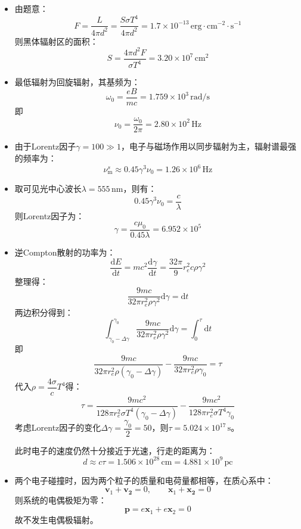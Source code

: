 \documentclass[a4paper,fontset=none]{ctexart}
\begin{document}
    \begin{itemize}
        \item[1.]
        由题意：
        \[
        F = \frac{L}{4\pi d^2} = \frac{S\sigma T^4}{4\pi d^2} = 1.7\times10^{-13}\,\mathrm{erg\cdot cm^{-2}\cdot s^{-1}}
        \]
        则黑体辐射区的面积：
        \[
        S = \frac{4\pi d^2 F}{\sigma T^4} = 3.20\times10^{7}\,\mathrm{cm^2}
        \]

        \item[2.(1)]
        最低辐射为回旋辐射，其基频为：
        \[
        \omega_0 = \frac{eB}{mc} = 1.759\times10^3\,\mathrm{rad/s}
        \]
        即
        \[
        \nu_0 = \frac{\omega_0}{2\pi} = 2.80\times10^2\,\mathrm{Hz}
        \]

        \item[2.(2)]
        由于Lorentz因子$\gamma = 100 \gg 1$，电子与磁场作用以同步辐射为主，辐射谱最强的频率为：
        \[
        \nu_\mathrm{m}^s \approx 0.45\gamma^3\nu_0 = 1.26\times10^6\,\mathrm{Hz}
        \]

        \item[2.(3)]
        取可见光中心波长$\lambda = 555\,\mathrm{nm}$，则有：
        \[
        0.45\gamma^3\nu_0 = \frac{c}{\lambda}
        \]
        则Lorentz因子为：
        \[
        \gamma = \frac{c\mu_0}{0.45\lambda} = 6.952\times10^{5}
        \]

        \item[4.]
        逆Compton散射的功率为：
        \[
        \frac{\mathrm{d}E}{\mathrm{d}t}
        = mc^2\frac{\mathrm{d}\gamma}{\mathrm{d}t}
        = \frac{32\pi}{9}r_e^2 c\rho\gamma^2
        \]
        整理得：
        \[
        \frac{9mc}{32\pi r_e^2\rho\gamma^2}\mathrm{d}\gamma = \mathrm{d}t
        \]
        两边积分得到：
        \[
        \int_{\gamma_0-\Delta\gamma}^{\gamma_0} \frac{9mc}{32\pi r_e^2\rho\gamma^2}\mathrm{d}\gamma = \int_0^\tau \mathrm{d}t
        \]
        即
        \[
        \frac{9mc}{32\pi r_e^2\rho(\gamma_0 - \Delta\gamma)}-\frac{9mc}{32\pi r_e^2\rho\gamma_0} = \tau
        \]
        代入$\rho = \dfrac{4\sigma}{c}T^4$得：
        \[
        \tau = \frac{9mc^2}{128\pi r_e^2 \sigma T^4(\gamma_0 - \Delta\gamma)}-\frac{9mc^2}{128\pi r_e^2 \sigma T^4\gamma_0}
        \]
        考虑Lorentz因子的变化$\Delta\gamma = \dfrac{\gamma_0}{2} = 50$，则$\tau = 5.024\times10^{17}\,\mathrm{s}$。

        此时电子的速度仍然十分接近于光速，行走的距离为：
        \[
        d \approx c\tau = 1.506\times10^{28}\,\mathrm{cm} = 4.881\times10^{9}\,\mathrm{pc}
        \]

        \item[4.]
        两个电子碰撞时，因为两个粒子的质量和电荷量都相等，在质心系中：
        \[
        \bm{v}_1 + \bm{v_2} = 0,\qquad \bm{x}_1 + \bm{x_2} = 0
        \]
        则系统的电偶极矩为零：
        \[
        \bm{p} = e\bm{x}_1 + e\bm{x}_2 = 0
        \]
        故不发生电偶极辐射。
    \end{itemize}
\end{document}

